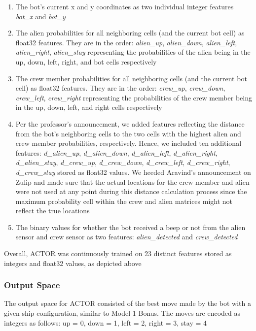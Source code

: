 \documentclass[11pt]{article}
\begin{document}
\begin{enumerate}
    \item The bot's current x and y coordinates as two individual integer features \emph{bot\_x} and \emph{bot\_y}
    \item The alien probabilities for all neighboring cells (and the current bot cell) as float32 features. They are in the order: \emph{alien\_up}, \emph{alien\_down}, \emph{alien\_left}, \emph{alien\_right}, \emph{alien\_stay} representing the probabilities of the alien being in the up, down, left, right, and bot cells respectively
    \item The crew member probabilities for all neighboring cells (and the current bot cell) as float32 features. They are in the order: \emph{crew\_up}, \emph{crew\_down}, \emph{crew\_left}, \emph{crew\_right} representing the probabilities of the crew member being in the up, down, left, and right cells respectively
    \item Per the professor's announcement, we added features reflecting the distance from the bot's neighboring cells to the two cells with the highest alien and crew member probabilities, respectively. Hence, we included ten additional features: \emph{d\_alien\_up}, \emph{d\_alien\_down}, \emph{d\_alien\_left}, \emph{d\_alien\_right}, \emph{d\_alien\_stay}, \emph{d\_crew\_up}, \emph{d\_crew\_down}, \emph{d\_crew\_left}, \emph{d\_crew\_right}, \emph{d\_crew\_stay} stored as float32 values. We heeded Aravind's announcement on Zulip and made sure that the actual locations for the crew member and alien were not used at any point during this distance calculation process since the maximum probability cell within the crew and alien matrices might not reflect the true locations
    \item The binary values for whether the bot received a beep or not from the alien sensor and crew sensor as two features: \emph{alien\_detected} and \emph{crew\_detected}
\end{enumerate}

Overall, ACTOR was continuously trained on 23 distinct features stored as integers and float32 values, as depicted above

\subsubsection{Output Space}

The output space for ACTOR consisted of the best move made by the bot with a given ship configuration, similar to Model 1 Bonus. The moves are encoded as integers as follows: up = 0, down = 1, left = 2, right = 3, stay = 4
\end{document}
